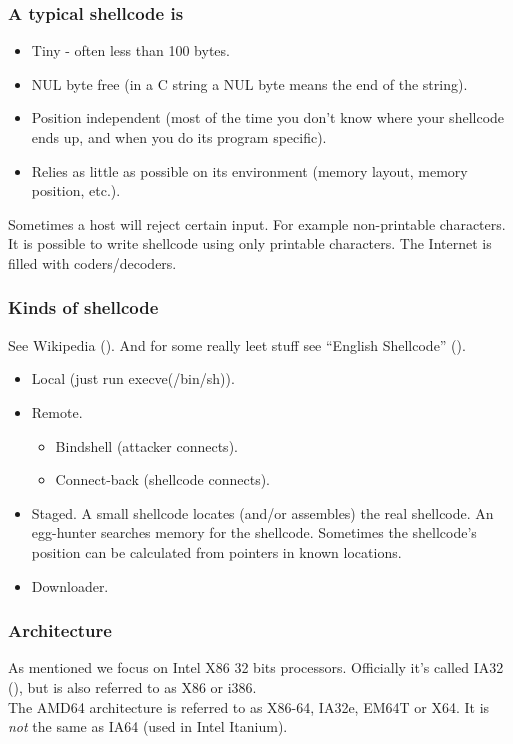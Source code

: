 \documentclass[slidestop,compress,mathserif, xcolor=table]{beamer}
\begin{document}
\begin{frame}
  \frametitle{A typical shellcode is}

  \begin{itemize}
  \item Tiny - often less than 100 bytes.
  \item NUL byte free (in a C string a NUL byte means the end of the string).
  \item Position independent (most of the time you don't know where your
    shellcode ends up, and when you do its program specific).
  \item Relies as little as possible on its environment (memory layout, memory
    position, etc.).
  \end{itemize}

  Sometimes a host will reject certain input. For example non-printable
  characters. It is possible to write shellcode using only printable
  characters. The Internet is filled with coders/decoders.
\end{frame}

\begin{frame}
  \frametitle{Kinds of shellcode}

  See Wikipedia (\cite{wiki-shellcode}). And for some really leet stuff see
  ``English Shellcode'' (\cite{mason2009}).

  \begin{itemize}
  \item Local (just run execve(/bin/sh)).
  \item Remote.
    \begin{itemize}
    \item Bindshell (attacker connects).
    \item Connect-back (shellcode connects).
    \end{itemize}
  \item Staged. A small shellcode locates (and/or assembles) the real
    shellcode. An egg-hunter searches memory for the shellcode. Sometimes
    the shellcode's position can be calculated from pointers in known locations.
  \item Downloader.
  \end{itemize}
\end{frame}

\begin{frame}
  \frametitle{Architecture}

  As mentioned we focus on Intel X86 32 bits processors. Officially it's called
  IA32 (\cite{wiki-ia32}), but is also referred to as X86 or i386.\\[1em]

  The AMD64 architecture is referred to as X86-64, IA32e, EM64T or X64. It is
  \emph{not} the same as IA64 (used in Intel Itanium).
\end{frame}
\end{document}
